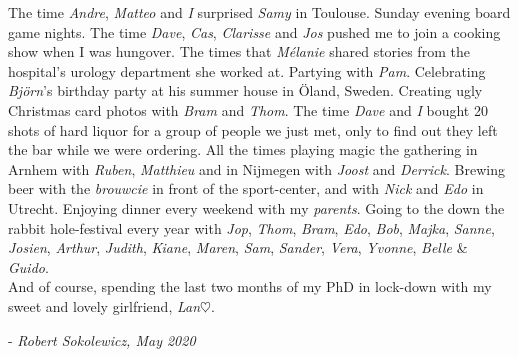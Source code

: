The time \emph{Andre}, \emph{Matteo} and \emph{I} surprised \emph{Samy} in Toulouse. Sunday evening board game nights. The time \emph{Dave}, \emph{Cas}, \emph{Clarisse} and \emph{Jos} pushed me to join a cooking show when I was hungover. The times that \emph{M\'elanie} shared stories from the hospital's urology department she worked at. Partying with \emph{Pam}. Celebrating \emph{Bj\"orn}'s birthday party at his summer house in \"Oland, Sweden. 
Creating ugly Christmas card photos with \emph{Bram} and \emph{Thom}. The time \emph{Dave} and \emph{I} bought 20 shots of hard liquor for a group of people we just met, only to find out they left the bar while we were ordering. All the times playing magic the gathering in Arnhem with \emph{Ruben}, \emph{Matthieu} and in Nijmegen with \emph{Joost} and \emph{Derrick}.
Brewing beer with the \emph{brouwcie} in front of the sport-center, and with \emph{Nick} and \emph{Edo} in Utrecht. Enjoying dinner every weekend with my \emph{parents}. Going to the down the rabbit hole-festival every year with \emph{Jop}, \emph{Thom}, \emph{Bram}, \emph{Edo}, \emph{Bob}, \emph{Majka}, \emph{Sanne}, \emph{Josien}, \emph{Arthur}, \emph{Judith}, \emph{Kiane}, \emph{Maren}, \emph{Sam}, \emph{Sander}, \emph{Vera}, \emph{Yvonne}, \emph{Belle} \& \emph{Guido}. \\[0.5em]


And of course, spending the last two months of my PhD in lock-down with my sweet and lovely girlfriend, \emph{Lan}$\heartsuit$.

\flushright - \emph{Robert Sokolewicz, May 2020}
